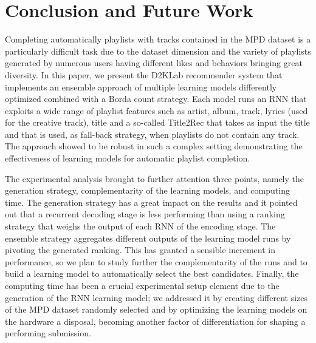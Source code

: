 \section{Conclusion and Future Work}
\label{sec:conclusion}
Completing automatically playlists with tracks contained in the MPD dataset is a particularly difficult task due to the dataset dimension and the variety of playlists generated by numerous users having different likes and behaviors bringing great diversity. In this paper, we present the D2KLab recommender system that implements an ensemble approach of multiple learning models differently optimized combined with a Borda count strategy. Each model runs an RNN that exploits a wide range of playlist features such as artist, album, track, lyrics (used for the creative track), title and a so-called Title2Rec that takes as input the title and that is used, as fall-back strategy, when playlists do not contain any track. The approach showed to be robust in such a complex setting demonstrating the effectiveness of learning models for automatic playlist completion.

The experimental analysis brought to further attention three points, namely the generation strategy, complementarity of the learning models, and computing time. The generation strategy has a great impact on the results and it pointed out that a recurrent decoding stage is less performing than using a ranking strategy that weighs the output of each RNN of the encoding stage. The ensemble strategy aggregates different outputs of the learning model runs by pivoting the generated ranking. This has granted a sensible increment in performance, so we plan to study further the complementarity of the runs and to build a learning model to automatically select the best candidates. Finally, the computing time has been a crucial experimental setup element due to the generation of the RNN learning model; we addressed it by creating different sizes of the MPD dataset randomly selected and by optimizing the learning models on the hardware a disposal, becoming another factor of differentiation for shaping a performing submission.


